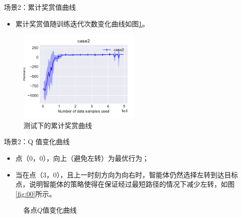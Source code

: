 \documentclass{beamer}
\begin{document}
\begin{frame}{场景2：累计奖赏值曲线}
    \begin{itemize}
        \item 累计奖赏值随训练迭代次数变化曲线如图\ref{fig:case2}。
    \end{itemize}
\begin{figure}
    \centering
    \includegraphics[width=6.0cm]{pic/case2/case1.pdf}
    \caption{测试下的累计奖赏曲线}
    \label{fig:case2}
\end{figure}
\end{frame}

\begin{frame}{场景2：Q 值变化曲线}
    \begin{itemize}
        \item 点（0，0），向上（避免左转）为最优行为；
        \item 当在点（3，0），且上一时刻方向为向右时，智能体仍然选择左转到达目标点，说明智能体的策略使得在保证经过最短路径的情况下减少左转，如图\ref{fig:00}所示。
    \end{itemize}
    \begin{figure}
      \centering
      \qquad
      \qquad
    \caption{各点$Q$值变化曲线}
    \label{fig:case2qvalue}
    \end{figure}
\end{frame}
\end{document}
